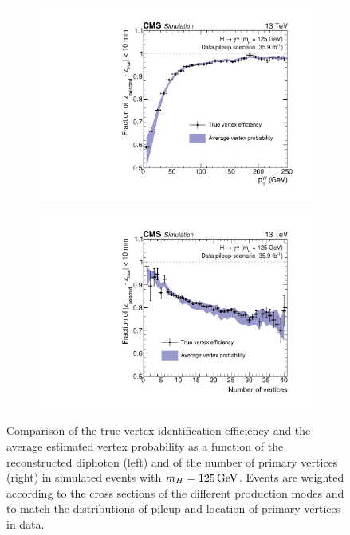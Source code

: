 \begin{figure}[h!]
  \centering
  \begin{subfigure}{0.49\textwidth}
    \includegraphics[width=\textwidth]{Figures/Objects/vtxprob_vspt}
    \label{fig:obj_vtxprob_vspt}
  \end{subfigure}
  \begin{subfigure}{0.49\textwidth}
    \includegraphics[width=\textwidth]{Figures/Objects/vtxprob_vsnvtx}
    \label{fig:obj_vtxprob_vsnvtx}
  \end{subfigure}
  \caption{
  Comparison of the true vertex identification efficiency and the average estimated
  vertex probability as a function of the reconstructed diphoton \pt (left) and of the number of
  primary vertices (right) in simulated \Hgg events with $m_{H} = \SI{125}{GeV}$. Events are weighted
  according to the cross sections of the different production modes and to match the distributions
  of pileup and location of primary vertices in data.
  }
  \label{fig:obj_vtxprob}
\end{figure}

